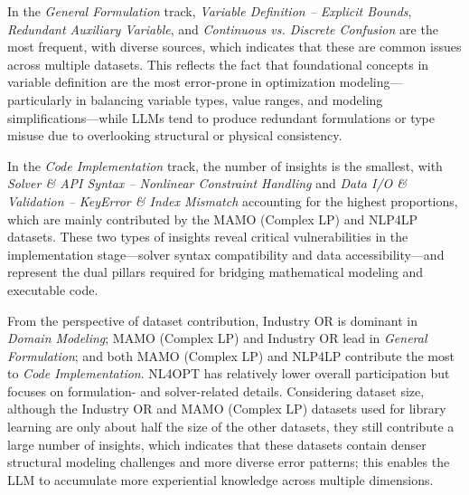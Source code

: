 \documentclass[sigconf, nonacm]{acmart}
\begin{document}
In the \emph{General Formulation} track, \emph{Variable Definition – Explicit Bounds}, \emph{Redundant Auxiliary Variable}, and \emph{Continuous vs. Discrete Confusion} are the most frequent, with diverse sources, which indicates that these are common issues across multiple datasets. This reflects the fact that foundational concepts in variable definition are the most error-prone in optimization modeling---particularly in balancing variable types, value ranges, and modeling simplifications---while LLMs tend to produce redundant formulations or type misuse due to overlooking structural or physical consistency.

In the \emph{Code Implementation} track, the number of insights is the smallest, with \emph{Solver \& API Syntax – Nonlinear Constraint Handling} and \emph{Data I/O \& Validation – KeyError \& Index Mismatch} accounting for the highest proportions, which are mainly contributed by the MAMO (Complex LP) and NLP4LP datasets. These two types of insights reveal critical vulnerabilities in the implementation stage—solver syntax compatibility and data accessibility---and represent the dual pillars required for bridging mathematical modeling and executable code.

From the perspective of dataset contribution, Industry OR is dominant in \emph{Domain Modeling}; MAMO (Complex LP) and Industry OR lead in \emph{General Formulation}; and both MAMO (Complex LP) and NLP4LP contribute the most to \emph{Code Implementation}. NL4OPT has relatively lower overall participation but focuses on formulation- and solver-related details. Considering dataset size, although the Industry OR and MAMO (Complex LP) datasets used for library learning are only about half the size of the other datasets, they still contribute a large number of insights, which indicates that these datasets contain denser structural modeling challenges and more diverse error patterns; this enables the LLM to accumulate more experiential knowledge across multiple dimensions.




\end{document}
